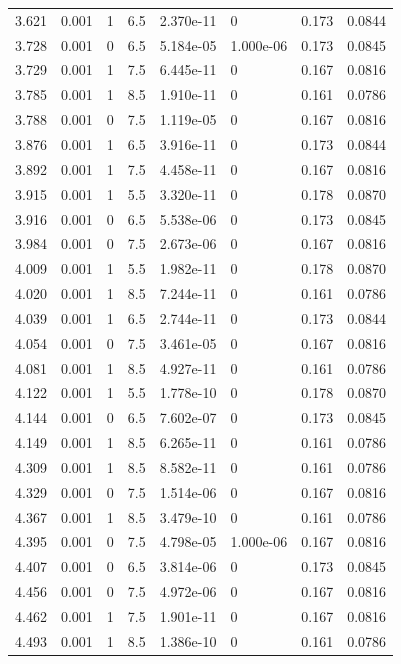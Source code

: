 \documentclass[preview]{standalone}
\begin{document}
{{{\begin{tabular}{L{1.2cm}C{1.2cm} C{0.3cm}C{0.5cm} C{1.4cm}C{1.4cm} C{1.4cm}C{1.4cm}}
  3.621  &  0.001  & 1     & 6.5 &  2.370e-11  & 0  & 0.173 &  0.0844   \\ 
  3.728  &  0.001  & 0     & 6.5 &  5.184e-05  & 1.000e-06  & 0.173 &  0.0845   \\ 
  3.729  &  0.001  & 1     & 7.5 &  6.445e-11  & 0  & 0.167 &  0.0816   \\ 
  3.785  &  0.001  & 1     & 8.5 &  1.910e-11  & 0  & 0.161 &  0.0786   \\ 
  3.788  &  0.001  & 0     & 7.5 &  1.119e-05  & 0  & 0.167 &  0.0816   \\ 
  3.876  &  0.001  & 1     & 6.5 &  3.916e-11  & 0  & 0.173 &  0.0844   \\ 
  3.892  &  0.001  & 1     & 7.5 &  4.458e-11  & 0  & 0.167 &  0.0816   \\ 
  3.915  &  0.001  & 1     & 5.5 &  3.320e-11  & 0  & 0.178 &  0.0870   \\ 
  3.916  &  0.001  & 0     & 6.5 &  5.538e-06  & 0  & 0.173 &  0.0845   \\ 
  3.984  &  0.001  & 0     & 7.5 &  2.673e-06  & 0  & 0.167 &  0.0816   \\ 
  4.009  &  0.001  & 1     & 5.5 &  1.982e-11  & 0  & 0.178 &  0.0870   \\ 
  4.020  &  0.001  & 1     & 8.5 &  7.244e-11  & 0  & 0.161 &  0.0786   \\ 
  4.039  &  0.001  & 1     & 6.5 &  2.744e-11  & 0  & 0.173 &  0.0844   \\ 
  4.054  &  0.001  & 0     & 7.5 &  3.461e-05  & 0  & 0.167 &  0.0816   \\ 
  4.081  &  0.001  & 1     & 8.5 &  4.927e-11  & 0  & 0.161 &  0.0786   \\ 
  4.122  &  0.001  & 1     & 5.5 &  1.778e-10  & 0  & 0.178 &  0.0870   \\ 
  4.144  &  0.001  & 0     & 6.5 &  7.602e-07  & 0  & 0.173 &  0.0845   \\ 
  4.149  &  0.001  & 1     & 8.5 &  6.265e-11  & 0  & 0.161 &  0.0786   \\ 
  4.309  &  0.001  & 1     & 8.5 &  8.582e-11  & 0  & 0.161 &  0.0786   \\ 
  4.329  &  0.001  & 0     & 7.5 &  1.514e-06  & 0  & 0.167 &  0.0816   \\ 
  4.367  &  0.001  & 1     & 8.5 &  3.479e-10  & 0  & 0.161 &  0.0786   \\ 
  4.395  &  0.001  & 0     & 7.5 &  4.798e-05  & 1.000e-06  & 0.167 &  0.0816   \\ 
  4.407  &  0.001  & 0     & 6.5 &  3.814e-06  & 0  & 0.173 &  0.0845   \\ 
  4.456  &  0.001  & 0     & 7.5 &  4.972e-06  & 0  & 0.167 &  0.0816   \\ 
  4.462  &  0.001  & 1     & 7.5 &  1.901e-11  & 0  & 0.167 &  0.0816   \\ 
  4.493  &  0.001  & 1     & 8.5 &  1.386e-10  & 0  & 0.161 &  0.0786   \\ 
\hline 
\end{tabular} 

}}}
\end{document}
